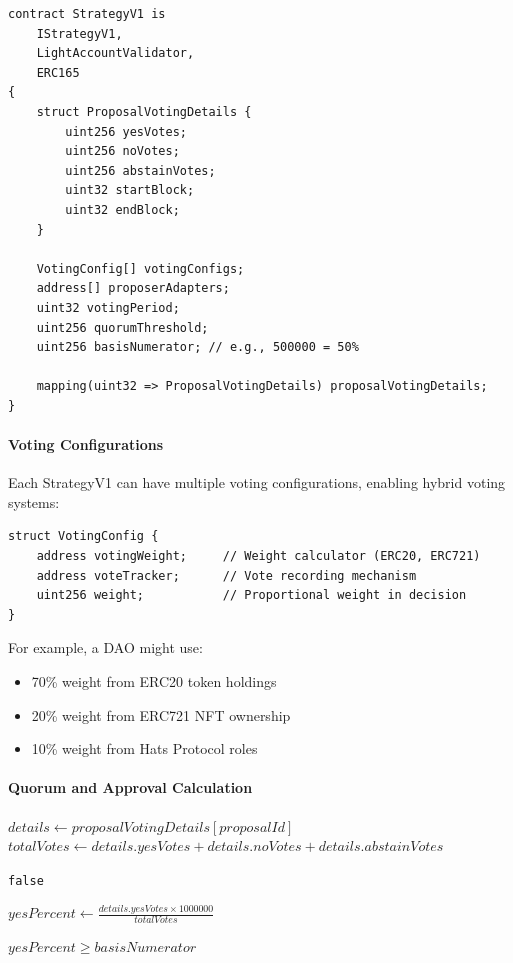 \documentclass[11pt,a4paper]{article}
\begin{document}
\begin{lstlisting}[caption=StrategyV1 Architecture]
contract StrategyV1 is
    IStrategyV1,
    LightAccountValidator,
    ERC165
{
    struct ProposalVotingDetails {
        uint256 yesVotes;
        uint256 noVotes;
        uint256 abstainVotes;
        uint32 startBlock;
        uint32 endBlock;
    }

    VotingConfig[] votingConfigs;
    address[] proposerAdapters;
    uint32 votingPeriod;
    uint256 quorumThreshold;
    uint256 basisNumerator; // e.g., 500000 = 50%

    mapping(uint32 => ProposalVotingDetails) proposalVotingDetails;
}
\end{lstlisting}

\paragraph{Voting Configurations}

Each StrategyV1 can have multiple voting configurations, enabling hybrid voting systems:

\begin{lstlisting}[caption=Voting Configuration Structure]
struct VotingConfig {
    address votingWeight;     // Weight calculator (ERC20, ERC721)
    address voteTracker;      // Vote recording mechanism
    uint256 weight;           // Proportional weight in decision
}
\end{lstlisting}

For example, a DAO might use:
\begin{itemize}
    \item 70\% weight from ERC20 token holdings
    \item 20\% weight from ERC721 NFT ownership
    \item 10\% weight from Hats Protocol roles
\end{itemize}

\paragraph{Quorum and Approval Calculation}

\begin{algorithm}
\caption{Vote Tallying and Approval}
\begin{algorithmic}[1]
    \State $details \gets proposalVotingDetails[proposalId]$
    \State $totalVotes \gets details.yesVotes + details.noVotes + details.abstainVotes$

        \State \Return \texttt{false}
    \EndIf

    \State $yesPercent \gets \frac{details.yesVotes \times 1000000}{totalVotes}$

    \State \Return $yesPercent \geq basisNumerator$
\EndFunction
\end{algorithmic}
\end{algorithm}
\end{document}
